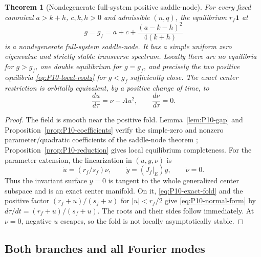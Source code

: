 \documentclass[11pt]{article}
\newcommand{\one}{\mathbf{1}}
\newtheorem{theorem}{Theorem}[section]
\theoremstyle{definition}
\theoremstyle{remark}
\begin{document}
\begin{theorem}[Nondegenerate full-system positive saddle-node]
\label{thm:P10-saddle-node}
For every fixed canonical $a>k+h$, $c,k,h>0$ and admissible $(n,q)$,
the equilibrium $r_f\one$ at
\[
 \boxed{g=g_f=a+c+\frac{(a-k-h)^2}{4(k+h)}}
\]
is a nondegenerate full-system saddle-node. It has a simple uniform
zero eigenvalue and strictly stable transverse spectrum. Locally there
are no equilibria for $g>g_f$, one double equilibrium for $g=g_f$,
and precisely the two positive equilibria \eqref{eq:P10-local-roots}
for $g<g_f$ sufficiently close. The exact center restriction is
orbitally equivalent, by a positive change of time, to
\begin{equation}
 \boxed{\frac{du}{d\tau}=\nu-Au^2,\qquad \frac{d\nu}{d\tau}=0.}
 \label{eq:P10-normal-form}
\end{equation}
\end{theorem}
\begin{proof}
The field is smooth near the positive fold. Lemma~\ref{lem:P10-gap}
and Proposition~\ref{prop:P10-coefficients} verify the simple-zero
and nonzero parameter/quadratic coefficients of the saddle-node theorem
\cite{KuznetsovFold2006,GuckenheimerHolmes1983};
Proposition~\ref{prop:P10-reduction} gives local equilibrium completeness.
For the parameter extension, the linearization in $(u,y,\nu)$ is
\begin{equation}
 \dot u=(r_f/s_f)\nu,\qquad \dot y=(J_f|_E)y,\qquad\dot\nu=0.
 \label{eq:P10-extended-linear}
\end{equation}
Thus the invariant surface $y=0$ is tangent to the whole generalized
center subspace and is an exact center manifold. On it,
\eqref{eq:P10-exact-fold} and the positive factor
$(r_f+u)/(s_f+u)$ for $|u|<r_f/2$ give
\eqref{eq:P10-normal-form} by $d\tau/dt=(r_f+u)/(s_f+u)$.
The roots and their sides follow immediately. At $\nu=0$, negative
$u$ escapes, so the fold is not locally asymptotically stable.
\end{proof}

\subsection{Both branches and all Fourier modes}
\label{slot:P10-2}
\end{document}

